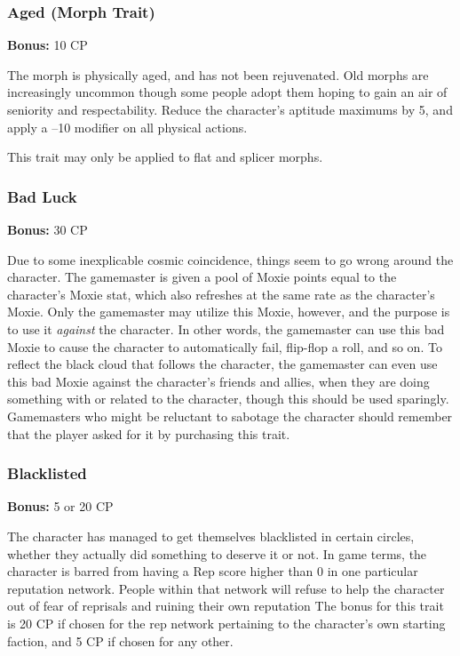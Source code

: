 \subsubsection{Aged (Morph Trait)}

\textbf{Bonus:} 10 CP

The morph is physically aged, and has not been 
rejuvenated. Old morphs are increasingly uncommon
though some people adopt them hoping to
gain an air of seniority and respectability. Reduce 
the character's aptitude maximums by 5, and apply 
a –10 modifier on all physical actions.

This trait may only be applied to flat and splicer 
morphs.

\subsubsection{Bad Luck}

\textbf{Bonus:} 30 CP

Due to some inexplicable cosmic coincidence, 
things seem to go wrong around the character. The 
gamemaster is given a pool of Moxie points equal 
to the character's Moxie stat, which also refreshes 
at the same rate as the character's Moxie. Only the 
gamemaster may utilize this Moxie, however, and 
the purpose is to use it \textit{against} the character. In other 
words, the gamemaster can use this bad Moxie to 
cause the character to automatically fail, flip-flop a 
roll, and so on. To reflect the black cloud that follows
the character, the gamemaster can even use this
bad Moxie against the character's friends and allies, 
when they are doing something with or related to 
the character, though this should be used sparingly. 
Gamemasters who might be reluctant to sabotage the 
character should remember that the player asked for 
it by purchasing this trait.

\subsubsection{Blacklisted}

\textbf{Bonus:} 5 or 20 CP

The character has managed to get themselves 
blacklisted in certain circles, whether they actually 
did something to deserve it or not. In game terms, the 
character is barred from having a Rep score higher 
than 0 in one particular reputation network. People 
within that network will refuse to help the character 
out of fear of reprisals and ruining their own reputation
The bonus for this trait is 20 CP if chosen for the
rep network pertaining to the character's own starting 
faction, and 5 CP if chosen for any other.

